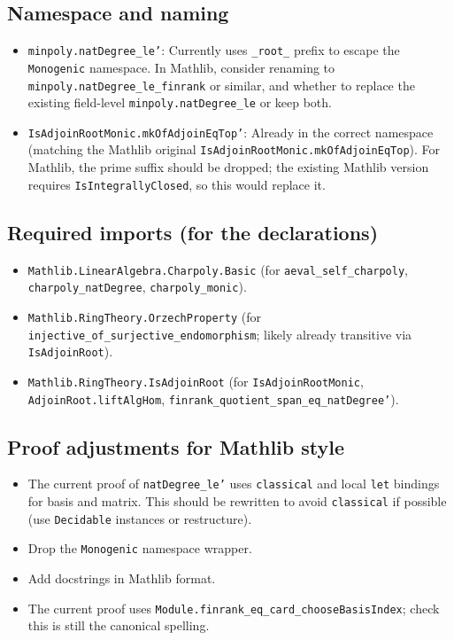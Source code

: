 \subsection*{Namespace and naming}

\begin{itemize}
  \item \texttt{minpoly.natDegree\_le'}: Currently uses \texttt{\_root\_} prefix
    to escape the \texttt{Monogenic} namespace. In Mathlib, consider renaming to
    \texttt{minpoly.natDegree\_le\_finrank} or similar,
    and whether to replace the existing field-level
    \texttt{minpoly.natDegree\_le} or keep both.
  \item \texttt{IsAdjoinRootMonic.mkOfAdjoinEqTop'}: Already in the correct
    namespace (matching the Mathlib original \texttt{IsAdjoinRootMonic.mkOfAdjoinEqTop}).
    For Mathlib, the prime suffix should be dropped; the existing Mathlib version
    requires \texttt{IsIntegrallyClosed}, so this would replace it.
\end{itemize}

\subsection*{Required imports (for the declarations)}
\begin{itemize}
  \item \texttt{Mathlib.LinearAlgebra.Charpoly.Basic}
    (for \texttt{aeval\_self\_charpoly}, \texttt{charpoly\_natDegree},
     \texttt{charpoly\_monic}).
  \item \texttt{Mathlib.RingTheory.OrzechProperty}
    (for \texttt{injective\_of\_surjective\_endomorphism};
     likely already transitive via \texttt{IsAdjoinRoot}).
  \item \texttt{Mathlib.RingTheory.IsAdjoinRoot}
    (for \texttt{IsAdjoinRootMonic}, \texttt{AdjoinRoot.liftAlgHom},
     \texttt{finrank\_quotient\_span\_eq\_natDegree'}).
\end{itemize}

\subsection*{Proof adjustments for Mathlib style}
\begin{itemize}
  \item The current proof of \texttt{natDegree\_le'} uses \texttt{classical}
    and local \texttt{let} bindings for basis and matrix. This should be
    rewritten to avoid \texttt{classical} if possible (use \texttt{Decidable}
    instances or restructure).
  \item Drop the \texttt{Monogenic} namespace wrapper.
  \item Add docstrings in Mathlib format.
  \item The current proof uses
    \texttt{Module.finrank\_eq\_card\_chooseBasisIndex};
    check this is still the canonical spelling.
\end{itemize}

